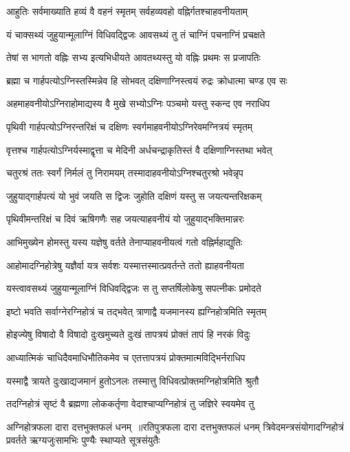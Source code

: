\twolineshloka
{आहुतिः सर्वमाख्याति हव्यं वै वहनं स्मृतम्}
{सर्वहव्यवहो वह्निर्गतश्चाहवनीयताम्}


\twolineshloka
{यं चाक्सथ्यं जुहुयान्मूलाग्निं विधिवद्द्विजः}
{आवसथ्यं तु तं चाग्निं पचनाग्निं प्रचक्षते}


\twolineshloka
{तेषां स भागतो वह्निः सभ्य इत्यभिधीयते}
{आवतथ्यस्तु यो वह्निः प्रथमः स प्रजापतिः}


\twolineshloka
{ब्रह्मा च गार्हपत्योऽग्निस्तस्मिन्नेव हि सोभवत्}
{दक्षिणाग्निस्त्वयं रुद्रः क्रोधात्मा चण्ड एव सः}


\twolineshloka
{अहमाहवनीयोऽग्निराहोमाद्यस्य वै मुखे}
{सभ्योऽग्निः पञ्चमो यस्तु स्कन्द एव नराधिप}


\twolineshloka
{पृथिवी गार्हपत्योऽग्निरन्तरिक्षं च दक्षिणः}
{स्वर्गमाहवनीयोऽग्निरेवमग्नित्रयं स्मृतम्}


\twolineshloka
{वृत्तश्च गार्हपत्योऽग्निर्यस्माद्वृत्ता च मेदिनी}
{अर्धचन्द्राकृतिस्तं वै दक्षिणाग्निस्तथा भवेत्}


\twolineshloka
{चतुरश्रं ततः स्वर्गं निर्मलं तु निरामयम्}
{तस्मादाहवनीयोऽग्निश्चतुरश्रो भवेन्नृप}


\twolineshloka
{जुहुयाद्गार्हपत्यं यो भुवं जयति स द्विजः}
{जुहोति दक्षिणं यस्तु स जयत्यन्तरिक्षकम्}


\twolineshloka
{पृथिवीमन्तरिक्षं च दिवं ऋषिगणैः सह}
{जयत्याहवनीयं यो जुहुयाद्भक्तिमान्नरः}


\twolineshloka
{आभिमुख्येन होमस्तु यस्य यज्ञेषु वर्तते}
{तेनाप्याहवनीयत्वं गतो वह्निर्महाद्युतिः}


\twolineshloka
{आहोमादग्निहोत्रेषु यज्ञैर्वा यत्र सर्वशः}
{यस्मात्तस्मात्प्रवर्तन्ते ततो ह्याहवनीयता}


\twolineshloka
{यस्त्वावसथ्यं जुहुयान्मूलाग्निं विधिवद्द्विजः}
{स तु सप्तर्षिलोकेषु सपत्नीकः प्रमोदते}


\twolineshloka
{इष्टो भवति सर्वाग्नेरग्निहोत्रं च तद्भवेत्}
{त्राणाद्वै यजमानस्य ह्यग्निहोत्रमिति स्मृतम्}


\twolineshloka
{होइज्येषु विषादो वै विषादो दुःखमुच्यते}
{दुःखं तापत्रयं प्रोक्तं तापं हि नरकं विदुः}


\twolineshloka
{आध्यात्मिकं चाधिदैवमाधिभौतिकमेव च}
{एतत्तापत्रयं प्रोक्तमात्मविद्भिर्नराधिप}


\twolineshloka
{यस्माद्वै त्रायते दुःखाद्यजमानं हुतोऽनलः}
{तस्मात्तु विधिवत्प्रोक्तमग्निहोत्रमिति श्रुतौ}


\twolineshloka
{तदग्निहोत्रं सृष्टं वै ब्रह्मणा लोककर्तृणा}
{वेदाश्चाप्यग्निहोत्रं तु जज्ञिरे स्वयमेव तु}


अग्निहोत्रफला दारा दत्तभुक्तफलं धनम् ॥रतिपुत्रफला दारा दत्तभुक्तफलं धनम्
\twolineshloka
{त्रिवेदमन्त्रसंयोगादग्निहोत्रं प्रवर्तते}
{ऋग्यजुःसामभिः पुण्यैः स्थाप्यते सूत्रसंयुतैः}


